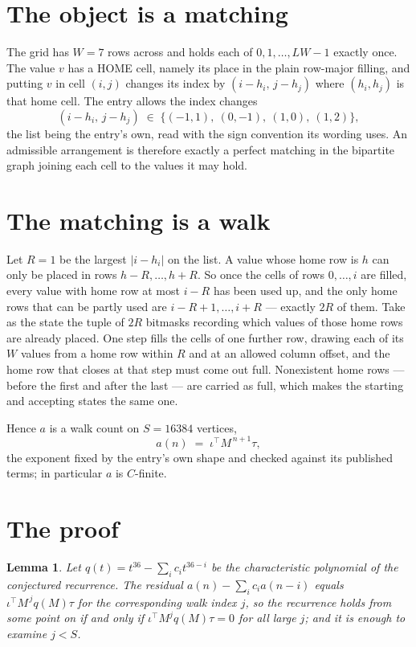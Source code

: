 \documentclass[11pt,a4paper]{article}
\theoremstyle{plain}
\newtheorem{lemma}[theorem]{Lemma}
\theoremstyle{definition}
\begin{document}
\section{The object is a matching}

The grid has $W=7$ rows across and holds each of $0,1,\dots,LW-1$ exactly once. The value
$v$ has a HOME cell, namely its place in the plain row-major filling, and putting $v$ in cell
$(i,j)$ changes its index by $(i-h_i,\,j-h_j)$ where $(h_i,h_j)$ is that home cell. The entry
allows the index changes
\[
(i-h_i,\,j-h_j)\;\in\;\{(-1,1),\ (0,-1),\ (1,0),\ (1,2)\},
\]
the list being the entry's own, read with the sign convention its wording uses. An admissible
arrangement is therefore exactly a perfect matching in the bipartite graph joining each cell to
the values it may hold.

\section{The matching is a walk}

Let $R=1$ be the largest $|i-h_i|$ on the list. A value whose home row is $h$ can only be
placed in rows $h-R,\dots,h+R$. So once the cells of rows $0,\dots,i$ are filled, every
value with home row at most $i-R$ has been used up, and the only home rows that can be
partly used are $i-R+1,\dots,i+R$ --- exactly $2R$ of them. Take as the state the tuple of
$2R$ bitmasks recording which values of those home rows are already placed. One step fills
the cells of one further row, drawing each of its $W$ values from a home row within $R$
and at an allowed column offset, and the home row that closes at that step must come out
full. Nonexistent home rows --- before the first and after the last --- are carried as
full, which makes the starting and accepting states the same one.

Hence $a$ is a walk count on $S=16384$ vertices,
\[
a(n)\;=\;\iota^{\!\top}M^{\,n+1}\tau ,
\]
the exponent fixed by the entry's own shape and checked against its published terms; in
particular $a$ is $C$-finite.

\section{The proof}

\begin{lemma}\label{lem:crit}
Let $q(t)=t^{36}-\sum_i c_it^{36-i}$ be the characteristic polynomial of the
conjectured recurrence. The residual $a(n)-\sum_ic_ia(n-i)$ equals
$\iota^{\!\top}M^{\,j}q(M)\tau$ for the corresponding walk index $j$, so the recurrence
holds from some point on if and only if $\iota^{\!\top}M^{j}q(M)\tau=0$ for all large $j$;
and it is enough to examine $j<S$.
\end{lemma}
\end{document}
